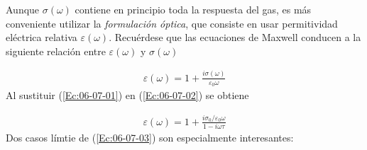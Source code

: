 Aunque $\sigma (\omega)$ contiene en principio toda la respuesta del gas, es más conveniente utilizar la \textit{formulación óptica}, que consiste en usar permitividad eléctrica relativa $\varepsilon(\omega)$. Recuérdese que las ecuaciones de Maxwell conducen a la siguiente relación entre $\varepsilon (\omega)$ y $\sigma (\omega)$ 
 
\begin{eqnarray}
	\varepsilon (\omega) = 1 + \frac{i \sigma(\omega)}{\varepsilon_0 \omega} \label{Ec:06-07-02}
\end{eqnarray}
Al sustituir (\ref{Ec:06-07-01}) en (\ref{Ec:06-07-02}) se obtiene 

\begin{eqnarray}
	\varepsilon(\omega) = 1 + \frac{i \sigma_0 / \varepsilon_0 \omega}{1-i\omega \tau} \label{Ec:06-07-03}
\end{eqnarray}
Dos casos límtie de (\ref{Ec:06-07-03}) son especialmente interesantes:

